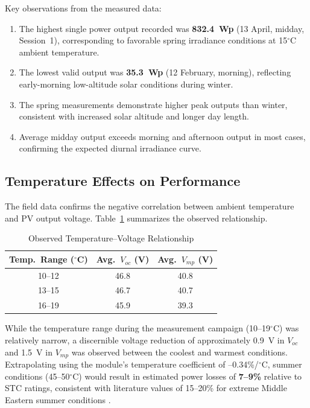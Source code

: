 Key observations from the measured data:

\begin{enumerate}
    \item The highest single power output recorded was \textbf{832.4~Wp} (13 April, midday, Session~1), corresponding to favorable spring irradiance conditions at 15$^{\circ}$C ambient temperature.
    \item The lowest valid output was \textbf{35.3~Wp} (12 February, morning), reflecting early-morning low-altitude solar conditions during winter.
    \item The spring measurements demonstrate higher peak outputs than winter, consistent with increased solar altitude and longer day length.
    \item Average midday output exceeds morning and afternoon output in most cases, confirming the expected diurnal irradiance curve.
\end{enumerate}


\subsection{Temperature Effects on Performance}

The field data confirms the negative correlation between ambient temperature and PV output voltage. Table~\ref{tab:temp_voltage} summarizes the observed relationship.

\begin{table}[H]
\centering
\caption{Observed Temperature--Voltage Relationship}
\label{tab:temp_voltage}
\begin{tabular}{@{}c c c@{}}
\toprule
\textbf{Temp.\ Range ($^{\circ}$C)} & \textbf{Avg.\ $V_{oc}$ (V)} & \textbf{Avg.\ $V_{mp}$ (V)} \\
\midrule
10--12 & 46.8 & 40.8 \\
13--15 & 46.7 & 40.7 \\
16--19 & 45.9 & 39.3 \\
\bottomrule
\end{tabular}
\end{table}

While the temperature range during the measurement campaign (10--19$^{\circ}$C) was relatively narrow, a discernible voltage reduction of approximately 0.9~V in $V_{oc}$ and 1.5~V in $V_{mp}$ was observed between the coolest and warmest conditions. Extrapolating using the module's temperature coefficient of --0.34\%/$^{\circ}$C, summer conditions (45--50$^{\circ}$C) would result in estimated power losses of \textbf{7--9\%} relative to STC ratings, consistent with literature values of 15--20\% for extreme Middle Eastern summer conditions \cite{skoplaki2009}.


